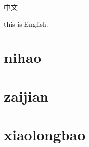 \documentclass{myclass}
\begin{document}
\kai 中文

this is English.

\section{nihao}
\section{zaijian}
\section{xiaolongbao}
\end{document}
